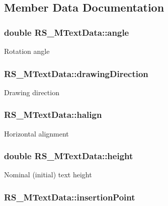 \subsection{Member Data Documentation}
\hypertarget{classRS__MTextData_a979811e38ef83634a3276e3d6f961cc7}{
\subsubsection[{angle}]{\setlength{\rightskip}{0pt plus 5cm}double R\-S\-\_\-\-M\-Text\-Data\-::angle}}\label{classRS__MTextData_a979811e38ef83634a3276e3d6f961cc7}
Rotation angle \hypertarget{classRS__MTextData_ae394311f49613c7a90950515b7bd107a}{
\subsubsection[{drawing\-Direction}]{ R\-S\-\_\-\-M\-Text\-Data\-::drawing\-Direction}}\label{classRS__MTextData_ae394311f49613c7a90950515b7bd107a}
Drawing direction \hypertarget{classRS__MTextData_ac5bd7fcfc21e0adccc5db96e150a1d49}{
\subsubsection[{halign}]{ R\-S\-\_\-\-M\-Text\-Data\-::halign}}\label{classRS__MTextData_ac5bd7fcfc21e0adccc5db96e150a1d49}
Horizontal alignment \hypertarget{classRS__MTextData_a6fa9e4fb1c385e168498576356a9829c}{
\subsubsection[{height}]{\setlength{\rightskip}{0pt plus 5cm}double R\-S\-\_\-\-M\-Text\-Data\-::height}}\label{classRS__MTextData_a6fa9e4fb1c385e168498576356a9829c}
Nominal (initial) text height \hypertarget{classRS__MTextData_a98cf185db140a1f8228e540a8b13053e}{
\subsubsection[{insertion\-Point}]{ R\-S\-\_\-\-M\-Text\-Data\-::insertion\-Point}}\label{classRS__MTextData_a98cf185db140a1f8228e540a8b13053e}
